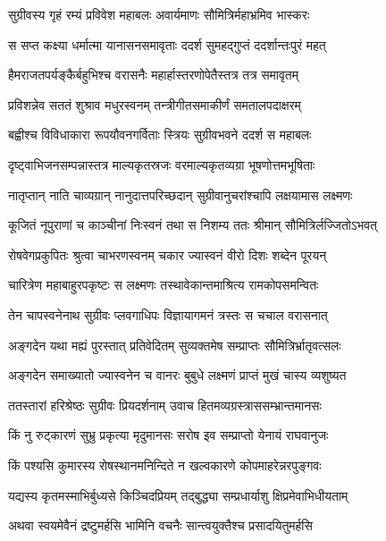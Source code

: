 \twolineshloka
{सुग्रीवस्य गृहं रम्यं प्रविवेश महाबलः}
{अवार्यमाणः सौमित्रिर्महाभ्रमिव भास्करः} %

\twolineshloka
{स सप्त कक्ष्या धर्मात्मा यानासनसमावृताः}
{ददर्श सुमहद्गुप्तं ददर्शान्तःपुरं महत्} %

\twolineshloka
{हैमराजतपर्यङ्कैर्बहुभिश्च वरासनैः}
{महार्हास्तरणोपेतैस्तत्र तत्र समावृतम्} %

\twolineshloka
{प्रविशन्नेव सततं शुश्राव मधुरस्वनम्}
{तन्त्रीगीतसमाकीर्णं समतालपदाक्षरम्} %

\twolineshloka
{बह्वीश्च विविधाकारा रूपयौवनगर्विताः}
{स्त्रियः सुग्रीवभवने ददर्श स महाबलः} %

\twolineshloka
{दृष्ट्वाभिजनसम्पन्नास्तत्र माल्यकृतस्रजः}
{वरमाल्यकृतव्यग्रा भूषणोत्तमभूषिताः} %

\twolineshloka
{नातृप्तान् नाति चाव्यग्रान् नानुदात्तपरिच्छदान्}
{सुग्रीवानुचरांश्चापि लक्षयामास लक्ष्मणः} %

\twolineshloka
{कूजितं नूपुराणां च काञ्चीनां निःस्वनं तथा}
{स निशम्य ततः श्रीमान् सौमित्रिर्लज्जितोऽभवत्} %

\twolineshloka
{रोषवेगप्रकुपितः श्रुत्वा चाभरणस्वनम्}
{चकार ज्यास्वनं वीरो दिशः शब्देन पूरयन्} %

\twolineshloka
{चारित्रेण महाबाहुरपकृष्टः स लक्ष्मणः}
{तस्थावेकान्तमाश्रित्य रामकोपसमन्वितः} %

\twolineshloka
{तेन चापस्वनेनाथ सुग्रीवः प्लवगाधिपः}
{विज्ञायागमनं त्रस्तः स चचाल वरासनात्} %

\twolineshloka
{अङ्गदेन यथा मह्यं पुरस्तात् प्रतिवेदितम्}
{सुव्यक्तमेष सम्प्राप्तः सौमित्रिर्भ्रातृवत्सलः} %

\twolineshloka
{अङ्गदेन समाख्यातो ज्यास्वनेन च वानरः}
{बुबुधे लक्ष्मणं प्राप्तं मुखं चास्य व्यशुष्यत} %

\twolineshloka
{ततस्तारां हरिश्रेष्ठः सुग्रीवः प्रियदर्शनाम्}
{उवाच हितमव्यग्रस्त्राससम्भ्रान्तमानसः} %

\twolineshloka
{किं नु रुट्कारणं सुभ्रु प्रकृत्या मृदुमानसः}
{सरोष इव सम्प्राप्तो येनायं राघवानुजः} %

\twolineshloka
{किं पश्यसि कुमारस्य रोषस्थानमनिन्दिते}
{न खल्वकारणे कोपमाहरेन्नरपुङ्गवः} %

\twolineshloka
{यद्यस्य कृतमस्माभिर्बुध्यसे किञ्चिदप्रियम्}
{तद्बुद्ध्या सम्प्रधार्याशु क्षिप्रमेवाभिधीयताम्} %

\twolineshloka
{अथवा स्वयमेवैनं द्रष्टुमर्हसि भामिनि}
{वचनैः सान्त्वयुक्तैश्च प्रसादयितुमर्हसि} %

